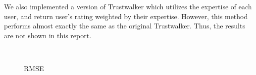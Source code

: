 \documentclass[12pt]{article}
\begin{document}
We also implemented a version of Trustwalker which utilizes the expertise of each user, and return user's rating weighted by their expertise. However, this method performs almost exactly the same as the original Trustwalker. Thus, the results are not shown in this report. 

\begin{figure}[htbp]
	\centering
	\\
	\caption{RMSE}
\end{figure}
\end{document}
